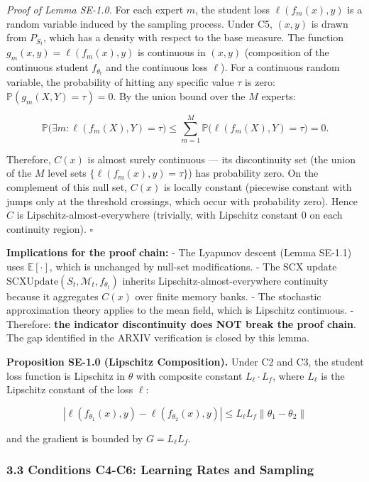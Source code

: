 \documentclass[
  12pt,
]{article}
\begin{document}
\emph{Proof of Lemma SE-1.0.} For each expert \(m\), the student loss
\(\ell(f_m(x), y)\) is a random variable induced by the sampling
process. Under C5, \((x, y)\) is drawn from \(P_{S_t}\), which has a
density with respect to the base measure. The function
\(g_m(x, y) = \ell(f_m(x), y)\) is continuous in \((x, y)\) (composition
of the continuous student \(f_{\theta_t}\) and the continuous loss
\(\ell\)). For a continuous random variable, the probability of hitting
any specific value \(\tau\) is zero:
\(\mathbb{P}(g_m(X, Y) = \tau) = 0\). By the union bound over the \(M\)
experts:

\[\mathbb{P}\bigl( \exists m: \ell(f_m(X), Y) = \tau \bigr) \leq \sum_{m=1}^M \mathbb{P}\bigl( \ell(f_m(X), Y) = \tau \bigr) = 0.\]

Therefore, \(C(x)\) is almost surely continuous --- its discontinuity
set (the union of the \(M\) level sets \(\{\ell(f_m(x), y) = \tau\}\))
has probability zero. On the complement of this null set, \(C(x)\) is
locally constant (piecewise constant with jumps only at the threshold
crossings, which occur with probability zero). Hence \(C\) is
Lipschitz-almost-everywhere (trivially, with Lipschitz constant 0 on
each continuity region). \(\square\)

\textbf{Implications for the proof chain:} - The Lyapunov descent (Lemma
SE-1.1) uses \(\mathbb{E}[\cdot]\), which is unchanged by null-set
modifications. - The SCX update
\(\text{SCXUpdate}(S_t, \mathcal{M}_t, f_{\theta_t})\) inherits
Lipschitz-almost-everywhere continuity because it aggregates \(C(x)\)
over finite memory banks. - The stochastic approximation theory applies
to the mean field, which is Lipschitz continuous. - Therefore:
\textbf{the indicator discontinuity does NOT break the proof chain}. The
gap identified in the ARXIV verification is closed by this lemma.

\textbf{Proposition SE-1.0 (Lipschitz Composition).} Under C2 and C3,
the student loss function is Lipschitz in \(\theta\) with composite
constant \(L_\ell \cdot L_f\), where \(L_\ell\) is the Lipschitz
constant of the loss \(\ell\):

\[
|\ell(f_{\theta_1}(x), y) - \ell(f_{\theta_2}(x), y)| \leq L_\ell L_f \|\theta_1 - \theta_2\|
\]

and the gradient is bounded by \(G = L_\ell L_f\).

\subsubsection{3.3 Conditions C4-C6: Learning Rates and
Sampling}\label{conditions-c4-c6-learning-rates-and-sampling}
\end{document}
